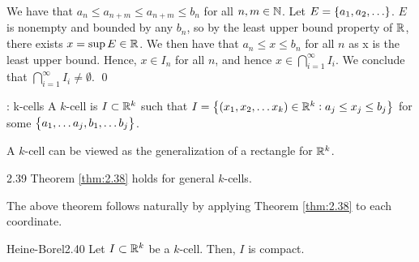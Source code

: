 \begin{nproof}
    We have that $a_n \leq a_{n + m} \leq a_{n + m} \leq b_n$ for all $n, m \in \mathbb{N}$. Let $E = \set{a_1, a_2, \ldots}$. $E$ is nonempty and bounded by any $b_n$, so by the least upper bound property of $\mathbb{R}$, there exists $x = \sup E \in \mathbb{R}$. We then have that $a_n \leq x \leq b_n$ for all $n$ as x is the least upper bound. Hence, $x \in I_n$ for all $n$, and hence $x \in \bigcap_{i=1}^\infty I_i$. We conclude that $\bigcap_{i=1}^\infty I_i \neq \emptyset$. \qed
\end{nproof}

\begin{ndef}{: k-cells}{}
    A $k$-cell is $I \subset \mathbb{R}^k$ such that $I = \set{(x_1, x_2, \ldots x_k) \in \mathbb{R}^k: a_j \leq x_j \leq b_j}$ for some $\set{a_1, \ldots a_j, b_1, \ldots b_j}$.
\end{ndef}
\noindent A $k$-cell can be viewed as the generalization of a rectangle for $\mathbb{R}^k$.

\begin{theorem}{}{2.39}
    Theorem \ref{thm:2.38} holds for general $k$-cells.
\end{theorem}
\noindent The above theorem follows naturally by applying Theorem \ref{thm:2.38} to each coordinate.

\begin{theorem}{Heine-Borel}{2.40}
    Let $I \subset \mathbb{R}^k$ be a $k$-cell. Then, $I$ is compact.
\end{theorem}

